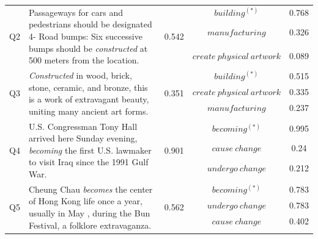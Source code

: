 \begin{itemize}
\begin{table}[tbh!]
{\begin{tabular}{cp{6cm}ccc}
\multirow{6}{*}{Q2} & \multirow{6}{6cm}{Passageways for cars and pedestrians should be designated 4- Road bumps: Six successive bumps should be \textit{constructed} at 500 meters from the location.} & \multirow{6}{*}{0.542} & \multirow{2}{*}{$building^{(*)}$} & \multirow{2}{*}{0.768} \\
& & & & \\ %
& & & \multirow{2}{*}{$manufacturing$} & \multirow{2}{*}{0.326} \\ 
& & & & \\  %
& & & \multirow{2}{*}{$create\ physical\ artwork$} & \multirow{2}{*}{0.089} \\
& & & & \\ \hline

\multirow{4}{*}{Q3} & \multirow{4}{6cm}{\textit{Constructed} in wood, brick, stone, ceramic, and bronze, this is a work of extravagant beauty, uniting many ancient art forms.} & \multirow{4}{*}{0.351} & $building^{(*)}$ & 0.515 \\ %
& & & $create\ physical\ artwork$ & 0.335 \\ %
& & & $manufacturing$ & 0.237 \\
& & & & \\ \toprule

\multirow{4}{*}{Q4} & \multirow{4}{6cm}{U.S. Congressman Tony Hall arrived here Sunday evening, \textit{becoming} the first U.S. lawmaker to visit Iraq since the 1991 Gulf War.} & \multirow{4}{*}{0.901} & $becoming^{(*)}$ & 0.995 \\ %
& & & $cause\ change$ & 0.24 \\ %
& & & $undergo\ change$ & 0.212 \\
& & & & \\ \hline

\multirow{4}{*}{Q5} & \multirow{4}{6cm}{Cheung Chau \textit{becomes} the center of Hong Kong life once a year, usually in May , during the Bun Festival, a folklore extravaganza.} & \multirow{4}{*}{0.562} & $becoming^{(*)}$ & 0.783 \\ %
& & & $undergo\ change$ & 0.783 \\  %
& & & $cause\ change$ & 0.402 \\
& & & & \\ \toprule


\end{tabular}}
\end{table}
\end{itemize}
